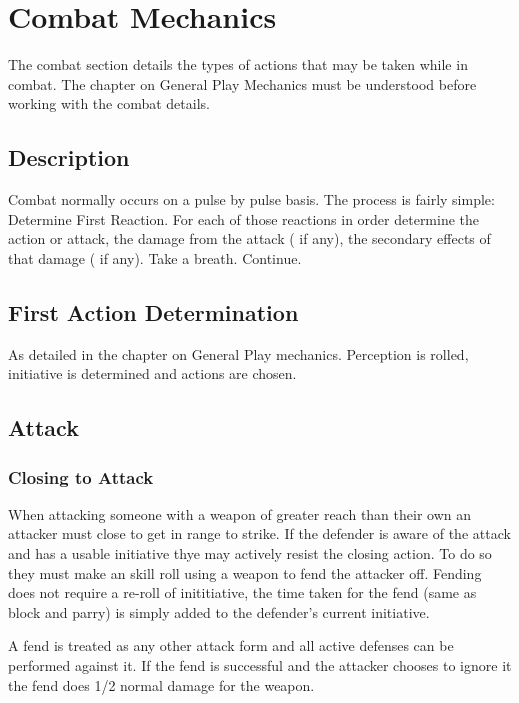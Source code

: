 \chapter{Combat Mechanics}

The combat section details the types of actions that may be taken 
while in combat. The chapter on General Play Mechanics must be 
understood before working with the combat details.

\section{Description}

Combat normally occurs on a pulse by pulse basis. The process is 
fairly simple: Determine First Reaction. For each of those reactions in 
order determine the action or attack, the damage from the attack ( if 
any), the secondary effects of that damage ( if any). Take a breath. 
Continue. 

\section{First Action Determination}

As detailed in the chapter on General Play mechanics. Perception
is rolled, initiative is determined and actions are chosen.

\section{Attack}

\subsection{Closing to Attack}

When attacking someone with a weapon of greater reach than their own an 
attacker must close to get in range to strike. If the defender is aware 
of the attack and has a usable initiative thye may actively resist the 
closing action. To do so they must make an skill roll using a weapon to
fend the attacker off. Fending does not require a re-roll of inititiative,
the time taken for the fend (same as block and parry) is simply added to 
the defender's current initiative. 

A fend is treated as any other attack form and all active defenses can be 
performed against it. If the fend is successful and the attacker chooses
to ignore it the fend does 1/2 normal damage for the weapon.

